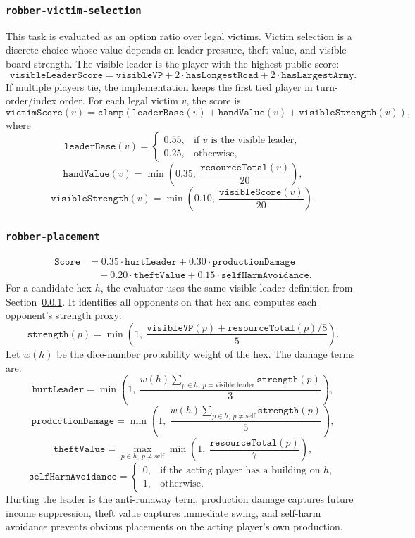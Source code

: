 \documentclass[letter,  12 pt]{article}
\begin{document}
\subsubsection{\texttt{robber-victim-selection}}
\label{app:task-robber-victim-selection}
This task is evaluated as an option ratio over legal victims.
Victim selection is a discrete choice whose value depends on leader pressure, theft value, and visible board strength.
The visible leader is the player with the highest public score:
\[
\texttt{visibleLeaderScore}
= \texttt{visibleVP}
+ 2 \cdot \texttt{hasLongestRoad}
+ 2 \cdot \texttt{hasLargestArmy}.
\]
If multiple players tie, the implementation keeps the first tied player in turn-order/index order.
For each legal victim $v$, the score is
\[
\texttt{victimScore}(v) =
\texttt{clamp}\left(
\texttt{leaderBase}(v)
+ \texttt{handValue}(v)
+ \texttt{visibleStrength}(v)
\right),
\]
where
\[
\texttt{leaderBase}(v) =
\begin{cases}
0.55, & \text{if } v \text{ is the visible leader},\\
0.25, & \text{otherwise},
\end{cases}
\]
\[
\texttt{handValue}(v) =
\min\left(0.35,\ \frac{\texttt{resourceTotal}(v)}{20}\right),
\]
\[
\texttt{visibleStrength}(v) =
\min\left(0.10,\ \frac{\texttt{visibleScore}(v)}{20}\right).
\]

\subsubsection{\texttt{robber-placement}}
\label{app:task-robber-placement}
\[
\begin{aligned}
\texttt{Score}
&= 0.35 \cdot \texttt{hurtLeader}
+ 0.30 \cdot \texttt{productionDamage} \\
&\quad + 0.20 \cdot \texttt{theftValue}
+ 0.15 \cdot \texttt{selfHarmAvoidance}.
\end{aligned}
\]
For a candidate hex $h$, the evaluator uses the same visible leader definition from Section~\ref{app:task-robber-victim-selection}. It identifies all opponents on that hex and computes each opponent's strength proxy:
\[
\texttt{strength}(p)
= \min\left(1,\ \frac{\texttt{visibleVP}(p) + \texttt{resourceTotal}(p)/8}{5}\right).
\]
Let $w(h)$ be the dice-number probability weight of the hex. The damage terms are:
\[
\texttt{hurtLeader}
= \min\left(1,\ \frac{w(h) \sum_{p \in h,\ p=\text{visible leader}}\texttt{strength}(p)}{3}\right),
\]
\[
\texttt{productionDamage}
= \min\left(1,\ \frac{w(h) \sum_{p \in h,\ p \ne \text{self}}\texttt{strength}(p)}{5}\right),
\]
\[
\texttt{theftValue}
= \max_{p \in h,\ p \ne \text{self}}\min\left(1,\ \frac{\texttt{resourceTotal}(p)}{7}\right),
\]
\[
\texttt{selfHarmAvoidance}
=
\begin{cases}
0, & \text{if the acting player has a building on } h,\\
1, & \text{otherwise}.
\end{cases}
\]
Hurting the leader is the anti-runaway term, production damage captures future income suppression, theft value captures immediate swing, and self-harm avoidance prevents obvious placements on the acting player's own production.
\end{document}
